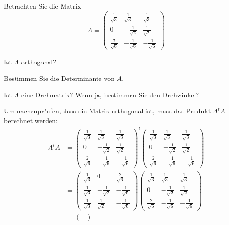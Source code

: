Betrachten Sie die Matrix
\[
A=
\begin{pmatrix}
\frac1{\sqrt{3}}&\frac1{\sqrt{3}}&\frac1{\sqrt{3}}\\
0&-\frac1{\sqrt{2}}&\frac1{\sqrt{2}}\\
\frac2{\sqrt{6}}&-\frac1{\sqrt{6}}&-\frac1{\sqrt{6}}
\end{pmatrix}
\]
\begin{teilaufgaben}
\item
Ist $A$ orthogonal?
\item
Bestimmen Sie die Determinante von $A$.
\item
Ist $A$ eine Drehmatrix? Wenn ja, bestimmen Sie den Drehwinkel?
\end{teilaufgaben}

\begin{loesung}
\begin{teilaufgaben}
\item
Um nachzupr"ufen, dass die Matrix orthogonal ist, muss das Produkt
$A^tA$ berechnet werden:
\begin{align*}
A^tA
&=
\begin{pmatrix}
\frac1{\sqrt{3}}&\frac1{\sqrt{3}}&\frac1{\sqrt{3}}\\
0&-\frac1{\sqrt{2}}&\frac1{\sqrt{2}}\\
\frac2{\sqrt{6}}&-\frac1{\sqrt{6}}&-\frac1{\sqrt{6}}
\end{pmatrix}^t
\begin{pmatrix}
\frac1{\sqrt{3}}&\frac1{\sqrt{3}}&\frac1{\sqrt{3}}\\
0&-\frac1{\sqrt{2}}&\frac1{\sqrt{2}}\\
\frac2{\sqrt{6}}&-\frac1{\sqrt{6}}&-\frac1{\sqrt{6}}
\end{pmatrix}
\\
&=
\begin{pmatrix}
\frac1{\sqrt{3}}&0&\frac2{\sqrt{6}}\\
\frac1{\sqrt{3}}&-\frac1{\sqrt{2}}&-\frac1{\sqrt{6}}\\
\frac1{\sqrt{3}}&\frac1{\sqrt{2}}&-\frac1{\sqrt{6}}
\end{pmatrix}
\begin{pmatrix}
\frac1{\sqrt{3}}&\frac1{\sqrt{3}}&\frac1{\sqrt{3}}\\
0&-\frac1{\sqrt{2}}&\frac1{\sqrt{2}}\\
\frac2{\sqrt{6}}&-\frac1{\sqrt{6}}&-\frac1{\sqrt{6}}
\end{pmatrix}
\\
&=
\begin{pmatrix}

\end{pmatrix}
\end{align*}
\end{teilaufgaben}
\end{loesung}
